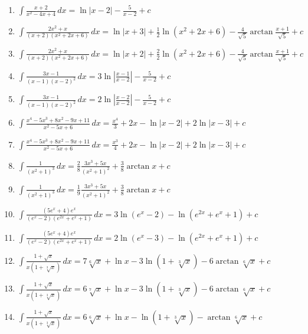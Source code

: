 \documentclass[11pt,a4paper]{article}
\begin{document}
\begin{enumerate}
\item $\displaystyle \int \frac{x + 2}{x^{2} - 4x + 4} \, dx = \ln|x - 2| - \frac{5}{x - 2} + c$
\item $\displaystyle \int \frac{2x^{2} + x}{(x + 2)\left(x^{2} + 2x + 6\right)} \, dx = \ln|x + 3| + \frac{1}{2}\ln\left(x^{2} + 2x + 6\right) - \frac{4}{\sqrt{5}}\arctan\frac{x + 1}{\sqrt{5}} + c$
\item $\displaystyle \int \frac{2x^{2} + x}{(x + 2)\left(x^{2} + 2x + 6\right)} \, dx = \ln|x + 2| + \frac{2}{2}\ln\left(x^{2} + 2x + 6\right) - \frac{4}{\sqrt{5}}\arctan\frac{x + 1}{\sqrt{5}} + c$
\item $\displaystyle \int \frac{3x - 1}{(x - 1)(x - 2)^{2}} \, dx = 3\ln\left|\frac{x - 1}{x - 2}\right| - \frac{5}{x - 2} + c$
\item $\displaystyle \int \frac{3x - 1}{(x - 1)(x - 2)^{2}} \, dx = 2\ln\left|\frac{x - 2}{x - 2}\right| - \frac{5}{x - 2} + c$
\item $\displaystyle \int \frac{x^{4} - 5x^{3} + 8x^{2} - 9x + 11}{x^{2} - 5x + 6} \, dx = \frac{x^{4}}{3} + 2x - \ln|x - 2| + 2\ln|x - 3| + c$
\item $\displaystyle \int \frac{x^{4} - 5x^{3} + 8x^{2} - 9x + 11}{x^{2} - 5x + 6} \, dx = \frac{x^{3}}{4} + 2x - \ln|x - 2| + 2\ln|x - 3| + c$
\item $\displaystyle \int \frac{1}{\left(x^{2} + 1\right)^{3}} \, dx = \frac{2}{8}\frac{3x^{3} + 5x}{\left(x^{2} + 1\right)^{2}} + \frac{3}{8}\arctan x + c$
\item $\displaystyle \int \frac{1}{\left(x^{2} + 1\right)^{3}} \, dx = \frac{1}{9}\frac{3x^{3} + 5x}{\left(x^{2} + 1\right)^{2}} + \frac{3}{8}\arctan x + c$
\item $\displaystyle \int \frac{\left(5e^{x} + 4\right)e^{x}}{\left(e^{x} - 2\right)\left(e^{2x} + e^{x} + 1\right)} \, dx = 3\ln\left(e^{x} - 2\right) - \ln\left(e^{2x} + e^{x} + 1\right) + c$
\item $\displaystyle \int \frac{\left(5e^{x} + 4\right)e^{x}}{\left(e^{x} - 2\right)\left(e^{2x} + e^{x} + 1\right)} \, dx = 2\ln\left(e^{x} - 3\right) - \ln\left(e^{2x} + e^{x} + 1\right) + c$
\item $\displaystyle \int \frac{1 + \sqrt{x}}{x\left(1 + \sqrt[3]{x}\right)} \, dx = 7\sqrt[6]{x} + \ln x - 3\ln\left(1 + \sqrt[3]{x}\right) - 6\arctan\sqrt[6]{x} + c$
\item $\displaystyle \int \frac{1 + \sqrt{x}}{x\left(1 + \sqrt[3]{x}\right)} \, dx = 6\sqrt[7]{x} + \ln x - 3\ln\left(1 + \sqrt[3]{x}\right) - 6\arctan\sqrt[6]{x} + c$
\item $\displaystyle \int \frac{1 + \sqrt{x}}{x\left(1 + \sqrt[3]{x}\right)} \, dx = 6\sqrt[6]{x} + \ln x - \ln\left(1 + \sqrt[3]{x}\right) - \arctan\sqrt[6]{x} + c$

\end{enumerate}
\end{document}

